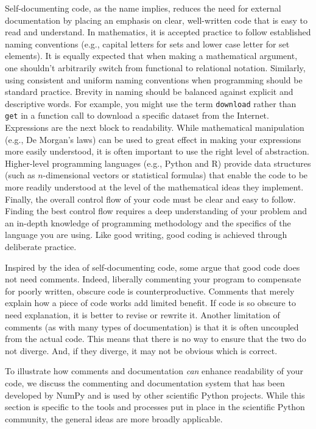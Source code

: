 \documentclass[ChapterTOCs,krantz2]{krantz} %
\begin{document}
Self-documenting code, as the name implies, reduces the need for external
documentation by placing an emphasis on clear, well-written code that is easy
to read and understand.  In mathematics, it is accepted practice to follow
established naming conventions (e.g., capital letters for sets and lower case
letter for set elements). It is equally expected that when making a
mathematical argument, one shouldn't arbitrarily switch from functional to
relational notation.  Similarly, using consistent and uniform naming
conventions when programming should be standard practice. Brevity in naming
should be balanced against explicit and descriptive words. For example, you
might use the term \texttt{download} rather than \texttt{get} in a function
call to download a specific dataset from the Internet. Expressions are the next
block to readability. While mathematical manipulation (e.g., De Morgan's laws)
can be used to great effect in making your expressions more easily understood,
it is often important to use the right level of abstraction. Higher-level
programming languages (e.g., Python and R) provide data structures (such as
$n$-dimensional vectors or statistical formulas) that enable the code to be
more readily understood at the level of the mathematical ideas they implement.
Finally, the overall control flow of your code must be clear and easy to
follow. Finding the best control flow requires a deep understanding of your
problem and an in-depth knowledge of programming methodology and the specifics
of the language you are using.  Like good writing, good coding is achieved
through deliberate practice.

Inspired by the idea of self-documenting code, some argue that good code does
not need comments. Indeed, liberally commenting your program to compensate for
poorly written, obscure code is counterproductive. Comments that merely explain
how a piece of code works add limited benefit. If code is so obscure to need
explanation, it is better to revise or rewrite it. Another limitation of
comments (as with many types of documentation) is that it is often uncoupled
from the actual code. This means that there is no way to ensure that the two do
not diverge.  And, if they diverge, it may not be obvious which is correct.

To illustrate how comments and documentation \emph{can} enhance readability of
your code, we discuss the commenting and documentation system that has been
developed by NumPy and is used by other scientific Python projects. While this
section is specific to the tools and processes put in place in the scientific
Python community, the general ideas are more broadly applicable.
\end{document}
